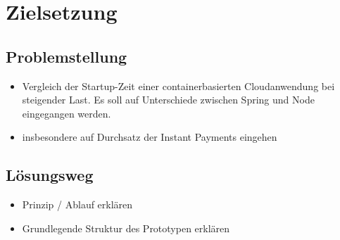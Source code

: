 \chapter{Zielsetzung}

\section{Problemstellung}
\begin{itemize}
  \item Vergleich der Startup-Zeit einer containerbasierten Cloudanwendung bei steigender Last. Es soll auf Unterschiede zwischen Spring und Node eingegangen werden.
  \item insbesondere auf Durchsatz der Instant Payments eingehen
\end{itemize}

\section{L\"osungsweg}
\begin{itemize}
  \item Prinzip / Ablauf erklären
  \item Grundlegende Struktur des Prototypen erklären
\end{itemize}


\cite{Knuth:1998:ACP:280635}